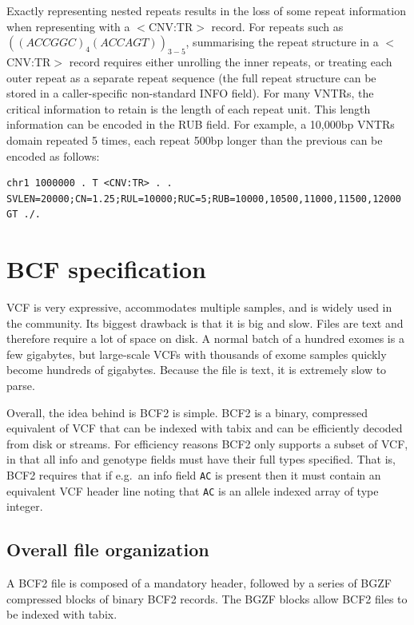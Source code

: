 \documentclass[8pt]{article}
\begin{document}
Exactly representing nested repeats results in the loss of some repeat information when representing with a $<$CNV:TR$>$ record.
For repeats such as $((ACCGGC)_{4}(ACCAGT))_{3-5}$, summarising the repeat structure in a $<$CNV:TR$>$ record requires either unrolling the inner repeats, or treating each outer repeat as a separate repeat sequence (the full repeat structure can be stored in a caller-specific non-standard INFO field).
For many VNTRs, the critical information to retain is the length of each repeat unit.
This length information can be encoded in the RUB field.
For example, a 10,000bp VNTRs domain repeated 5 times, each repeat 500bp longer than the previous can be encoded as follows:

\footnotesize
\begin{verbatim}
chr1 1000000 . T <CNV:TR> . . SVLEN=20000;CN=1.25;RUL=10000;RUC=5;RUB=10000,10500,11000,11500,12000 GT ./.
\end{verbatim}
\normalsize


	
	
\pagebreak
\section{BCF specification}

VCF is very expressive, accommodates multiple samples, and is widely used in the community.
Its biggest drawback is that it is big and slow.
Files are text and therefore require a lot of space on disk.
A normal batch of a hundred exomes is a few gigabytes, but large-scale VCFs with thousands of exome samples quickly become hundreds of gigabytes.
Because the file is text, it is extremely slow to parse.

Overall, the idea behind is BCF2 is simple.
BCF2 is a binary, compressed equivalent of VCF that can be indexed with tabix and can be efficiently decoded from disk or streams.
For efficiency reasons BCF2 only supports a subset of VCF, in that all info and genotype fields must have their full types specified.
That is, BCF2 requires that if e.g.\ an info field {\tt AC} is present then it must contain an equivalent VCF header line noting that {\tt AC} is an allele indexed array of type integer.

\subsection{Overall file organization}

A BCF2 file is composed of a mandatory header, followed by a series of BGZF compressed blocks of binary BCF2 records.
The BGZF blocks allow BCF2 files to be indexed with tabix.
\end{document}
